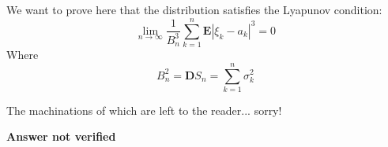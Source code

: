 \subsection{}

We want to prove here that the distribution satisfies the Lyapunov condition:
\begin{equation}
	\lim_{n\rightarrow \infty} \frac{1}{B_n^3} \sum_{k=1}^n \textbf{E}|\xi_k - a_k|^3 = 0
\end{equation}
Where
\begin{equation}
	B_n^2 = \textbf{D}S_n = \sum_{k=1}^n \sigma^2_k
\end{equation}

The machinations of which are left to the reader... sorry!

\textbf{Answer not verified}

%
%
%	





